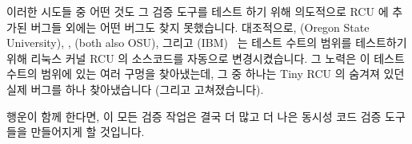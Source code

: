 \fi

이러한 시도들 중 어떤 것도 그 검증 도구를 테스트 하기 위해 의도적으로 RCU 에
추가된 버그들 외에는 어떤 버그도 찾지 못했습니다.
대조적으로,
 (Oregon State University), ,
 (both also OSU), 그리고 
(IBM)~\cite{Groce:2015:VMC:2916135.2916190}
는  테스트 수트의 범위를 테스트하기 위해 리눅스 커널 RCU 의
소스코드를 자동으로 변경시켰습니다.
그 노력은 이 테스트 수트의 범위에 있는 여러 구멍을 찾아냈는데, 그 중 하나는
Tiny RCU 의 숨겨져 있던 실제 버그를 하나 찾아냈습니다 (그리고 고쳐졌습니다).

행운이 함께 한다면, 이 모든 검증 작업은 결국 더 많고 더 나은 동시성 코드 검증
도구들을 만들어지게 할 것입니다.

\iffalse

None of these efforts located any bugs other than bugs injected into
RCU specifically to test the verification tools.
In contrast,
\ppl{Alex}{Groce} (Oregon State University), \ppl{Iftekhar}{Ahmed},
\ppl{Carlos}{Jensen} (both also OSU), and \pplmdl{Paul E.}{McKenney}
(IBM)~\cite{Groce:2015:VMC:2916135.2916190}
automatically mutated Linux-kernel RCU's source code to test the
coverage of the \co{rcutorture} test suite.
The effort found several holes in this suite's coverage, one of which
was hiding a real bug (since fixed) in Tiny RCU\@.

With some luck, all of this validation work will eventually result in
more and better tools for validating concurrent code.

\fi
